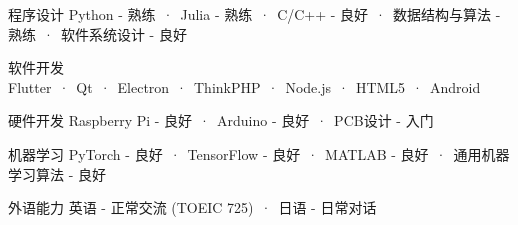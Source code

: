 

\begin{cvskills}
  \cvskill
    {程序设计} %
    {Python - 熟练\ ·\ Julia - 熟练\ ·\ C/C++ - 良好\ ·\ 数据结构与算法 - 熟练\ ·\ 软件系统设计 - 良好} %
    
  \cvskill
    {软件开发} %
    {Flutter\ ·\ Qt\ ·\ Electron\ ·\ ThinkPHP\ ·\ Node.js\ ·\ HTML5\ ·\ Android} %

  \cvskill
    {硬件开发} %
    {Raspberry Pi - 良好\ ·\ Arduino - 良好\ ·\ PCB设计 - 入门} %

  \cvskill
    {机器学习} %
    {PyTorch - 良好\ ·\ TensorFlow - 良好\ ·\ MATLAB - 良好\ ·\ 通用机器学习算法 - 良好} %

    
  \cvskill
    {外语能力} %
    {英语 - 正常交流 (TOEIC 725)\ ·\ 日语 - 日常对话} %
    

\end{cvskills}